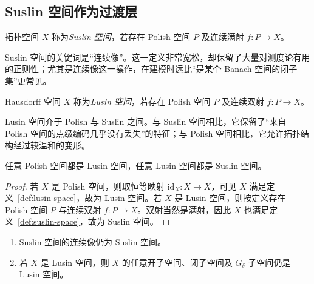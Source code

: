 \subsection{Suslin 空间作为过渡层}

\begin{definition}[Suslin 空间]\label{def:suslin-space}
拓扑空间 $X$ 称为\emph{Suslin 空间}，若存在 Polish 空间 $P$ 及连续满射 $f\colon P\to X$。
\end{definition}

Suslin 空间的关键词是“连续像”。这一定义非常宽松，却保留了大量对测度论有用的正则性；尤其是连续像这一操作，在建模时远比“是某个 Banach 空间的闭子集”更常见。

\begin{definition}[Lusin 空间]\label{def:lusin-space}
Hausdorff 空间 $X$ 称为\emph{Lusin 空间}，若存在 Polish 空间 $P$ 及连续双射 $f\colon P\to X$。
\end{definition}

Lusin 空间介于 Polish 与 Suslin 之间。与 Suslin 空间相比，它保留了“来自 Polish 空间的点级编码几乎没有丢失”的特征；与 Polish 空间相比，它允许拓扑结构经过较温和的变形。

\begin{proposition}\label{prop:polish-lusin-suslin}
任意 Polish 空间都是 Lusin 空间，任意 Lusin 空间都是 Suslin 空间。
\end{proposition}

\begin{proof}
若 $X$ 是 Polish 空间，则取恒等映射 $\mathrm{id}_X\colon X\to X$，可见 $X$ 满足定义~\ref{def:lusin-space}，故为 Lusin 空间。若 $X$ 是 Lusin 空间，则按定义存在 Polish 空间 $P$ 与连续双射 $f\colon P\to X$。双射当然是满射，因此 $X$ 也满足定义~\ref{def:suslin-space}，故为 Suslin 空间。
\end{proof}

\begin{proposition}\label{prop:suslin-lusin-stability}
\begin{enumerate}
  \item Suslin 空间的连续像仍为 Suslin 空间。
  \item 若 $X$ 是 Lusin 空间，则 $X$ 的任意开子空间、闭子空间及 $G_\delta$ 子空间仍是 Lusin 空间。
\end{enumerate}
\end{proposition}

